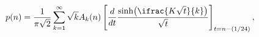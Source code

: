 \[\mathop{p\/}\nolimits\!\left(n\right)=\frac{1}{\pi\sqrt{2}}\sum_{k=1}^{\infty}%
\sqrt{k}A_{k}(n)\*\left[\frac{d}{dt}\frac{\mathop{\sinh\/}\nolimits\!\left(%
\ifrac{K\sqrt{t}}{k}\right)}{\sqrt{t}}\right]_{t=n-(1/24)},\]